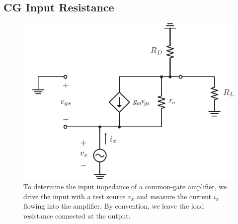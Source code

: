 \subsection{CG Input Resistance}
\begin{figure}[tb]
\begin{center}
\includegraphics[scale=.9]{cgamp_is_ac_ss_zin}
\end{center}
\caption{To determine the input impedance of a common-gate amplifier, we drive the input with a test source $v_x$ and measure the current $i_x$ flowing into the amplifier.  By convention, we leave the load resistance connected at the output.}
\label{fig:cgamp_is_ac_ss_zin}
\end{figure}

